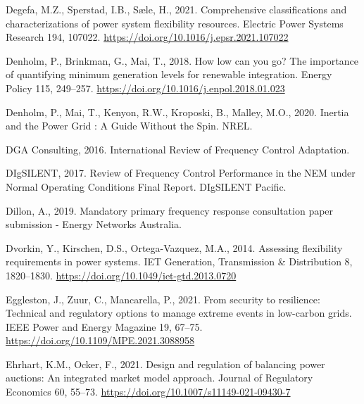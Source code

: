 \documentclass[12pt,a4paper,]{report}
\newlength{\cslhangindent}
\newenvironment{CSLReferences}[2] %
 {%
  \setlength{\parindent}{0pt}
  \ifodd #1 \everypar{\setlength{\hangindent}{\cslhangindent}}\ignorespaces\fi
  \ifnum #2 > 0
  \setlength{\parskip}{#2\baselineskip}
  \fi
 }%
 {}
\begin{document}
\begin{CSLReferences}{1}{0}
\leavevmode{}%
Degefa, M.Z., Sperstad, I.B., Sæle, H., 2021. Comprehensive
classifications and characterizations of power system flexibility
resources. Electric Power Systems Research 194, 107022.
\url{https://doi.org/10.1016/j.epsr.2021.107022}

\leavevmode{}%
Denholm, P., Brinkman, G., Mai, T., 2018. How low can you go? {The}
importance of quantifying minimum generation levels for renewable
integration. Energy Policy 115, 249--257.
\url{https://doi.org/10.1016/j.enpol.2018.01.023}

\leavevmode{}%
Denholm, P., Mai, T., Kenyon, R.W., Kroposki, B., Malley, M.O., 2020.
Inertia and the {Power Grid} : {A Guide Without} the {Spin}. {NREL}.

\leavevmode{}%
DGA Consulting, 2016. International {Review} of {Frequency Control
Adaptation}.

\leavevmode{}%
DIgSILENT, 2017. Review of {Frequency Control Performance} in the {NEM}
under {Normal Operating Conditions Final Report}. {DIgSILENT Pacific}.

\leavevmode{}%
Dillon, A., 2019. Mandatory primary frequency response consultation
paper submission - {Energy Networks Australia}.

\leavevmode{}%
Dvorkin, Y., Kirschen, D.S., Ortega-Vazquez, M.A., 2014. Assessing
flexibility requirements in power systems. IET Generation, Transmission
\& Distribution 8, 1820--1830.
\url{https://doi.org/10.1049/iet-gtd.2013.0720}

\leavevmode{}%
Eggleston, J., Zuur, C., Mancarella, P., 2021. From security to
resilience: {Technical} and regulatory options to manage extreme events
in low-carbon grids. IEEE Power and Energy Magazine 19, 67--75.
\url{https://doi.org/10.1109/MPE.2021.3088958}

\leavevmode{}%
Ehrhart, K.M., Ocker, F., 2021. Design and regulation of balancing power
auctions: An integrated market model approach. Journal of Regulatory
Economics 60, 55--73. \url{https://doi.org/10.1007/s11149-021-09430-7}


\end{CSLReferences}
\end{document}
